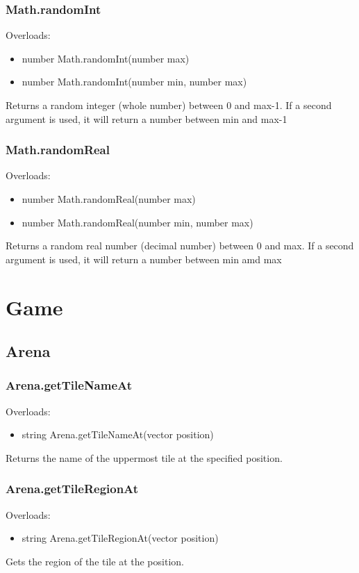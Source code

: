 \documentclass{book}
\newenvironment{ulist}
	{\begin{itemize}
			\itemsep0em}
	{\end{itemize}}
\begin{document}
\subsubsection{Math.randomInt}
Overloads:
\begin{ulist}
	\item number Math.randomInt(number max)
	\item number Math.randomInt(number min, number max)
\end{ulist}
Returns a random integer (whole number) between 0 and max-1.
If a second argument is used, it will return a number between min and max-1

\subsubsection{Math.randomReal}
Overloads:
\begin{ulist}
	\item number Math.randomReal(number max)
	\item number Math.randomReal(number min, number max)
\end{ulist}
Returns a random real number (decimal number) between 0 and max.
If a second argument is used, it will return a number between min amd max



\section{Game}
\subsection{Arena}
\subsubsection{Arena.getTileNameAt}
Overloads:
\begin{ulist}
	\item string Arena.getTileNameAt(vector position)
\end{ulist}
Returns the name of the uppermost tile at the specified position.

\subsubsection{Arena.getTileRegionAt}
Overloads:
\begin{ulist}
	\item string Arena.getTileRegionAt(vector position)
\end{ulist}
Gets the region of the tile at the position.
\end{document}
